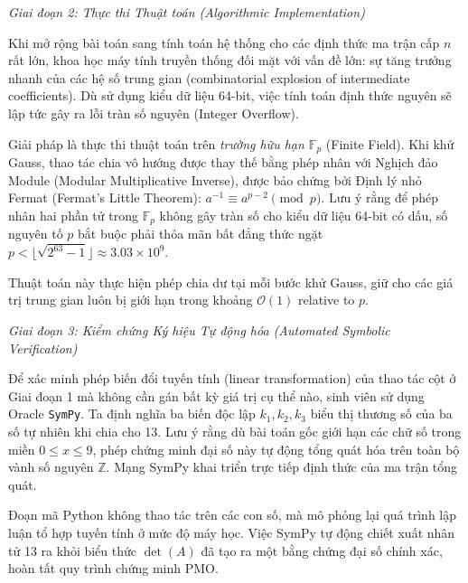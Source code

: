 \documentclass{article}
\begin{document}
\vspace{0.5em}\noindent\emph{Giai đoạn 2: Thực thi Thuật toán (Algorithmic Implementation)}

Khi mở rộng bài toán sang tính toán hệ thống cho các định thức ma trận cấp $n$ rất lớn, khoa học máy tính truyền thống đối mặt với vấn đề lớn: sự tăng trưởng nhanh của các hệ số trung gian (combinatorial explosion of intermediate coefficients). Dù sử dụng kiểu dữ liệu 64-bit, việc tính toán định thức nguyên sẽ lập tức gây ra lỗi tràn số nguyên (Integer Overflow). 

Giải pháp là thực thi thuật toán trên \textit{trường hữu hạn $\mathbb{F}_p$} (Finite Field). Khi khử Gauss, thao tác chia vô hướng được thay thế bằng phép nhân với Nghịch đảo Module (Modular Multiplicative Inverse), được bảo chứng bởi Định lý nhỏ Fermat (Fermat's Little Theorem): $a^{-1} \equiv a^{p-2} \pmod p$. Lưu ý rằng để phép nhân hai phần tử trong $\mathbb{F}_p$ không gây tràn số cho kiểu dữ liệu 64-bit có dấu, số nguyên tố $p$ bắt buộc phải thỏa mãn bất đẳng thức ngặt $p < \lfloor\sqrt{2^{63}-1}\rfloor \approx 3.03 \times 10^9$.

Thuật toán này thực hiện phép chia dư tại mỗi bước khử Gauss, giữ cho các giá trị trung gian luôn bị giới hạn trong khoảng $\mathcal{O}(1)$ relative to $p$.

\vspace{0.5em}\noindent\emph{Giai đoạn 3: Kiểm chứng Ký hiệu Tự động hóa (Automated Symbolic Verification)}

Để xác minh phép biến đổi tuyến tính (linear transformation) của thao tác cột ở Giai đoạn 1 mà không cần gán bất kỳ giá trị cụ thể nào, sinh viên sử dụng Oracle \texttt{\textsf{SymPy}}. Ta định nghĩa ba biến độc lập $k_1, k_2, k_3$ biểu thị thương số của ba số tự nhiên khi chia cho 13. Lưu ý rằng dù bài toán gốc giới hạn các chữ số trong miền $0 \le x \le 9$, phép chứng minh đại số này tự động tổng quát hóa trên toàn bộ vành số nguyên $\mathbb{Z}$. Mạng \textsf{SymPy} khai triển trực tiếp định thức của ma trận tổng quát.

Đoạn mã Python không thao tác trên các con số, mà mô phỏng lại quá trình lập luận tổ hợp tuyến tính ở mức độ máy học. Việc \textsf{SymPy} tự động chiết xuất nhân tử 13 ra khỏi biểu thức $\det(A)$ đã tạo ra một bằng chứng đại số chính xác, hoàn tất quy trình chứng minh PMO.
\end{document}
